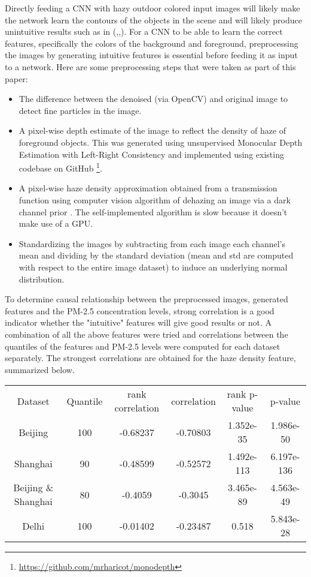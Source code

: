 \documentclass{article}
\begin{document}
Directly feeding a CNN with hazy outdoor colored input images will likely make the network learn the contours of the objects in the scene and will likely produce unintuitive results such as in (\cite{PPconv},\cite{EAPconv},\cite{IBAQconv}). For a CNN to be able to learn the correct features, specifically the colors of the background and foreground, preprocessing the images by generating intuitive features is essential before feeding it as input to a network. Here are some preprocessing steps that were taken as part of this paper:
\begin{itemize}
    \item The difference between the denoised (via OpenCV) and original image to detect fine particles in the image.
    \item A pixel-wise depth estimate of the image to reflect the density of haze of foreground objects. This was generated using unsupervised Monocular Depth Estimation with Left-Right Consistency \cite{monodepth} and implemented using existing codebase on GitHub \footnote{\url{https://github.com/mrharicot/monodepth}}.
    \item A pixel-wise haze density approximation obtained from a transmission function using computer vision algorithm of dehazing an image via a dark channel prior \cite{dcp}. The self-implemented algorithm is slow because it doesn't make use of a GPU. 
    \item Standardizing the images by subtracting from each image each channel's mean and dividing by the standard deviation (mean and std are computed with respect to the entire image dataset) to induce an underlying normal distribution.
\end{itemize}
To determine causal relationship between the preprocessed images, generated features and the PM-2.5 concentration levels, strong correlation is a good indicator whether the "intuitive" features will give good results or not. A combination of all the above features were tried and correlations between the quantiles of the features and PM-2.5 levels were computed for each dataset separately. The strongest correlations are obtained for the haze density feature, summarized below.
\begin{center}
\begin{tabular}{ c c c c c c}
 Dataset & Quantile & rank correlation & correlation & rank p-value & p-value\\ 
 Beijing & 100 & -0.68237 & -0.70803 & 1.352e-35 & 1.986e-50\\  
 Shanghai & 90 & -0.48599  & -0.52572 & 1.492e-113 & 6.197e-136 \\
 Beijing \& Shanghai & 80 & -0.4059  & -0.3045 & 3.465e-89 & 4.563e-49\\
 Delhi & 100 & -0.01402  & -0.23487 & 0.518 & 5.843e-28 \\
\end{tabular}
\end{center}
\end{document}
